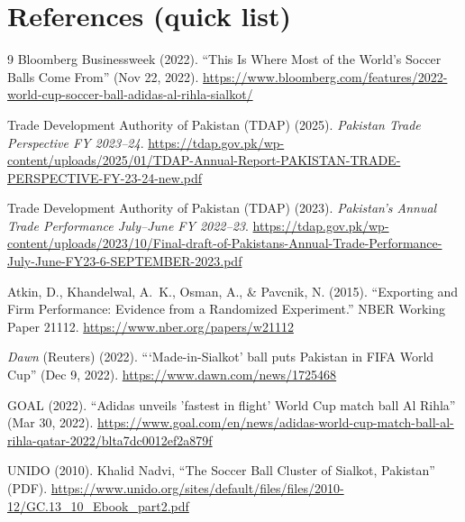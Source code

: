 \documentclass[11pt]{article}
\begin{document}
\section*{References (quick list)}
\begin{thebibliography}{9}
\setlength{\itemsep}{0.35em}
Bloomberg Businessweek (2022).
\newblock ``This Is Where Most of the World’s Soccer Balls Come From'' (Nov 22, 2022).
\newblock \url{https://www.bloomberg.com/features/2022-world-cup-soccer-ball-adidas-al-rihla-sialkot/}

Trade Development Authority of Pakistan (TDAP) (2025).
\newblock \emph{Pakistan Trade Perspective FY 2023--24}.
\newblock \url{https://tdap.gov.pk/wp-content/uploads/2025/01/TDAP-Annual-Report-PAKISTAN-TRADE-PERSPECTIVE-FY-23-24-new.pdf}

Trade Development Authority of Pakistan (TDAP) (2023).
\newblock \emph{Pakistan’s Annual Trade Performance July--June FY 2022--23}.
\newblock \url{https://tdap.gov.pk/wp-content/uploads/2023/10/Final-draft-of-Pakistans-Annual-Trade-Performance-July-June-FY23-6-SEPTEMBER-2023.pdf}

Atkin, D., Khandelwal, A.\ K., Osman, A., \& Pavcnik, N. (2015).
\newblock ``Exporting and Firm Performance: Evidence from a Randomized Experiment.''
NBER Working Paper 21112.
\newblock \url{https://www.nber.org/papers/w21112}

\emph{Dawn} (Reuters) (2022).
\newblock ``‘Made-in-Sialkot’ ball puts Pakistan in FIFA World Cup'' (Dec 9, 2022).
\newblock \url{https://www.dawn.com/news/1725468}

GOAL (2022).
\newblock ``Adidas unveils 'fastest in flight' World Cup match ball Al Rihla'' (Mar 30, 2022).
\newblock \url{https://www.goal.com/en/news/adidas-world-cup-match-ball-al-rihla-qatar-2022/blta7dc0012ef2a879f}

UNIDO (2010).
\newblock Khalid Nadvi, ``The Soccer Ball Cluster of Sialkot, Pakistan'' (PDF).
\newblock \url{https://www.unido.org/sites/default/files/files/2010-12/GC.13_10_Ebook_part2.pdf}
\end{thebibliography}
\end{document}
